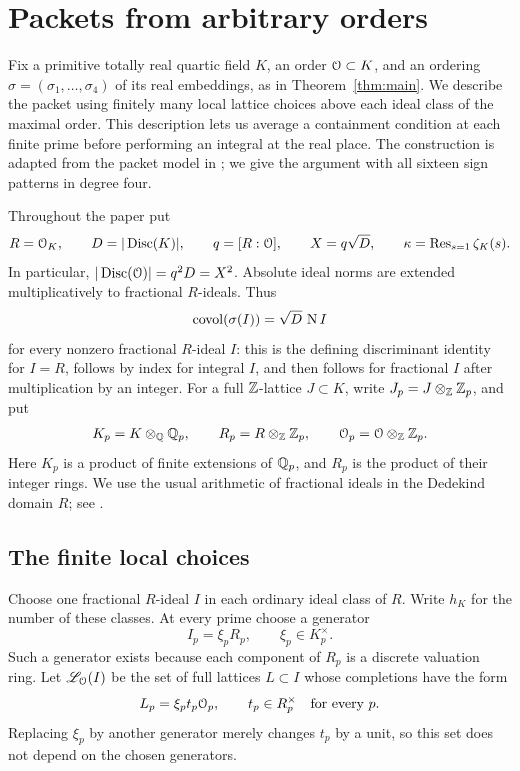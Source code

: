 \section{Packets from arbitrary orders}\label{sec:packets}

Fix a primitive totally real quartic field \(K\), an order \(\mathcal O\subset K\),
and an ordering \(\sigma=(\sigma_1,\ldots,\sigma_4)\) of its real embeddings,
as in Theorem~\ref{thm:main}.  We describe the packet using finitely many
local lattice choices above each ideal class of the maximal order.  This
description lets us average a containment condition at each finite prime
before performing an integral at the real place.  The construction is
adapted from the packet model in
\cite[Section~2, Lemma~2.1]{PrimeDegreePackets}; we give the argument with
all sixteen sign patterns in degree four.

Throughout the paper put
\begin{equation}\label{eq:pkt-scale}
 R=\mathcal O_K,\qquad D=|\operatorname{Disc}(K)|,\qquad q=[R:\mathcal O],\qquad
 X=q\sqrt D,\qquad \kappa=\operatorname{Res}_{s=1}\zeta_K(s).
\end{equation}
In particular, \(|\operatorname{Disc}(\mathcal O)|=q^2D=X^2\).  Absolute ideal norms are
extended multiplicatively to fractional \(R\)-ideals.  Thus
\begin{equation}\label{eq:pkt-covolume}
 \operatorname{covol}(\sigma(I))=\sqrt D\,\operatorname{N} I
\end{equation}
for every nonzero fractional \(R\)-ideal \(I\): this is the defining
discriminant identity for \(I=R\), follows by index for integral \(I\),
and then follows for fractional \(I\) after multiplication by an integer.
For a full \(\mathbb Z\)-lattice \(J\subset K\), write
\(J_p=J\otimes_\mathbb Z\mathbb Z_p\), and put
\[
 K_p=K\otimes_\mathbb Q\mathbb Q_p,\qquad R_p=R\otimes_\mathbb Z\mathbb Z_p,\qquad
 \mathcal O_p=\mathcal O\otimes_\mathbb Z\mathbb Z_p .
\]
Here \(K_p\) is a product of finite extensions of \(\mathbb Q_p\), and \(R_p\)
is the product of their integer rings.  We use the usual arithmetic of
fractional ideals in the Dedekind domain \(R\); see
\cite[Theorems~3.7, 3.20, and~3.29]{MilneANT}.

\subsection{The finite local choices}

Choose one fractional \(R\)-ideal \(I\) in each ordinary ideal class of
\(R\).  Write \(h_K\) for the number of these classes.  At every prime
choose a generator
\[
 I_p=\xi_p R_p,\qquad \xi_p\in K_p^\times.
\]
Such a generator exists because each component of \(R_p\) is a discrete
valuation ring.  Let \(\mathscr L_{\mathcal O}(I)\) be the set of full lattices
\(L\subset I\) whose completions have the form
\begin{equation}\label{eq:pkt-local-choices}
 L_p=\xi_p t_p\mathcal O_p,\qquad t_p\in R_p^\times
 \quad\text{for every }p.
\end{equation}
Replacing \(\xi_p\) by another generator merely changes \(t_p\) by a
unit, so this set does not depend on the chosen generators.

